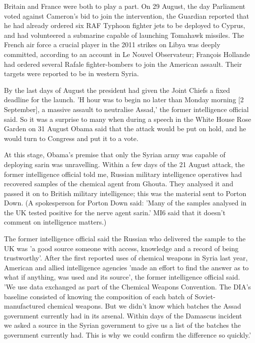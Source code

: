 Britain and France were both to play a part. On 29 August, the day
Parliament voted against Cameron's bid to join the intervention, the
Guardian reported that he had already ordered six RAF Typhoon fighter
jets to be deployed to Cyprus, and had volunteered a submarine capable
of launching Tomahawk missiles. The French air force \textendash{}
a crucial player in the 2011 strikes on Libya \textendash{} was deeply
committed, according to an account in Le Nouvel Observateur; François
Hollande had ordered several Rafale fighter-bombers to join the American
assault. Their targets were reported to be in western Syria.

By the last days of August the president had given the Joint Chiefs
a fixed deadline for the launch. 'H hour was to begin no later than
Monday morning {[}2 September{]}, a massive assault to neutralise
Assad,' the former intelligence official said. So it was a surprise
to many when during a speech in the White House Rose Garden on 31
August Obama said that the attack would be put on hold, and he would
turn to Congress and put it to a vote.

At this stage, Obama's premise \textendash{} that only the Syrian
army was capable of deploying sarin \textendash{} was unravelling.
Within a few days of the 21 August attack, the former intelligence
official told me, Russian military intelligence operatives had recovered
samples of the chemical agent from Ghouta. They analysed it and passed
it on to British military intelligence; this was the material sent
to Porton Down. (A spokesperson for Porton Down said: 'Many of the
samples analysed in the UK tested positive for the nerve agent sarin.'
MI6 said that it doesn't comment on intelligence matters.)

The former intelligence official said the Russian who delivered the
sample to the UK was 'a good source \textendash{} someone with access,
knowledge and a record of being trustworthy'. After the first reported
uses of chemical weapons in Syria last year, American and allied intelligence
agencies 'made an effort to find the answer as to what if anything,
was used \textendash{} and its source', the former intelligence official
said. 'We use data exchanged as part of the Chemical Weapons Convention.
The DIA's baseline consisted of knowing the composition of each batch
of Soviet-manufactured chemical weapons. But we didn't know which
batches the Assad government currently had in its arsenal. Within
days of the Damascus incident we asked a source in the Syrian government
to give us a list of the batches the government currently had. This
is why we could confirm the difference so quickly.'

